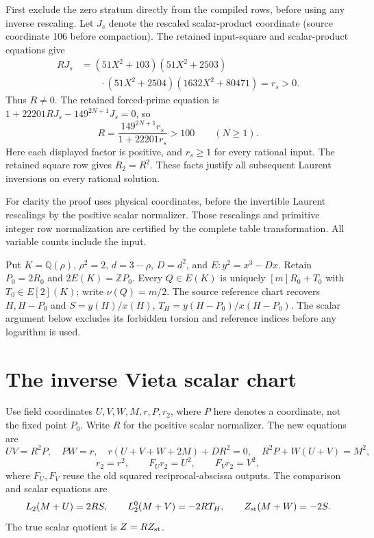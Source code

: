 \documentclass[11pt]{article}
\newcommand{\Q}{\mathbb Q}\newcommand{\Z}{\mathbb Z}
\begin{document}
First exclude the zero stratum directly from the compiled rows, before
using any inverse rescaling. Let $J_s$ denote the rescaled scalar-product
coordinate (source coordinate 106 before compaction). The retained
input-square and scalar-product equations give
\[
 \begin{aligned}
RJ_s&=(51X^2+103)(51X^2+2503)\\
&\qquad\cdot(51X^2+2504)(1632X^2+80471)=r_s>0.
\end{aligned}
\]
Thus $R\ne0$. The retained forced-prime equation is
$1+22201RJ_s-149^{2N+1}J_s=0$, so
\[
 R=\frac{149^{2N+1}r_s}{1+22201r_s}>100 \qquad(N\ge1).
\]
Here each displayed factor is positive, and $r_s\ge1$ for every rational
input. The retained square row gives $R_2=R^2$. These facts justify all
subsequent Laurent inversions on every rational solution.

For clarity the proof uses physical coordinates, before the invertible
Laurent rescalings by the positive scalar normalizer. Those rescalings
and primitive integer row normalization are certified by the complete
table transformation. All variable counts include the input.

Put $K=\Q(\rho)$, $\rho^2=2$, $d=3-\rho$, $D=d^2$, and
$E:y^2=x^3-Dx$. Retain $P_0=2R_0$ and $2E(K)=\Z P_0$.
Every $Q\in E(K)$ is uniquely $[m]R_0+T_0$ with $T_0\in E[2](K)$;
write $\nu(Q)=m/2$. The source reference chart recovers $H,H-P_0$ and
$S=y(H)/x(H)$, $T_H=y(H-P_0)/x(H-P_0)$.
The scalar argument below excludes its forbidden torsion and reference
indices before any logarithm is used.

\section*{The inverse Vieta scalar chart}
Use field coordinates $U,V,W,M,r,P,r_2$, where $P$ here denotes a
coordinate, not the fixed point $P_0$. Write $R$ for the positive scalar
normalizer. The new equations are
\[
 UV=R^2P,\quad PW=r,\quad
 r(U+V+W+2M)+DR^2=0,\quad R^2P+W(U+V)=M^2,
\]
\[
 r_2=r^2,\qquad F_U r_2=U^2,\qquad F_V r_2=V^2,
\]
where $F_U,F_V$ reuse the old squared reciprocal-abscissa outputs. The
comparison and scalar equations are
\[
 L_2(M+U)=2RS,\qquad L_2^0(M+V)=-2RT_H,
 \qquad Z_{\rm st}(M+W)=-2S.
\]
The true scalar quotient is $Z=RZ_{\rm st}$.
\end{document}
